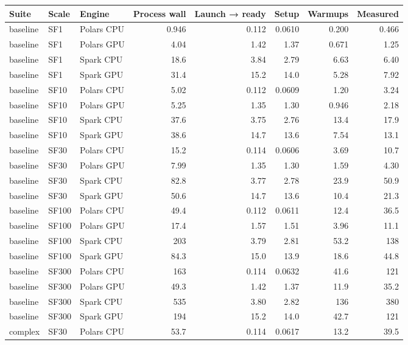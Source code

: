 \begin{longtable}{lllrrrrr}
\toprule
Suite & Scale & Engine & Process wall & Launch → ready & Setup & Warmups & Measured \\
\midrule
\endhead
\bottomrule
\endfoot
baseline & SF1 & Polars CPU & 0.946 & 0.112 & 0.0610 & 0.200 & 0.466 \\
baseline & SF1 & Polars GPU & 4.04 & 1.42 & 1.37 & 0.671 & 1.25 \\
baseline & SF1 & Spark CPU & 18.6 & 3.84 & 2.79 & 6.63 & 6.40 \\
baseline & SF1 & Spark GPU & 31.4 & 15.2 & 14.0 & 5.28 & 7.92 \\
baseline & SF10 & Polars CPU & 5.02 & 0.112 & 0.0609 & 1.20 & 3.24 \\
baseline & SF10 & Polars GPU & 5.25 & 1.35 & 1.30 & 0.946 & 2.18 \\
baseline & SF10 & Spark CPU & 37.6 & 3.75 & 2.76 & 13.4 & 17.9 \\
baseline & SF10 & Spark GPU & 38.6 & 14.7 & 13.6 & 7.54 & 13.1 \\
baseline & SF30 & Polars CPU & 15.2 & 0.114 & 0.0606 & 3.69 & 10.7 \\
baseline & SF30 & Polars GPU & 7.99 & 1.35 & 1.30 & 1.59 & 4.30 \\
baseline & SF30 & Spark CPU & 82.8 & 3.77 & 2.78 & 23.9 & 50.9 \\
baseline & SF30 & Spark GPU & 50.6 & 14.7 & 13.6 & 10.4 & 21.3 \\
baseline & SF100 & Polars CPU & 49.4 & 0.112 & 0.0611 & 12.4 & 36.5 \\
baseline & SF100 & Polars GPU & 17.4 & 1.57 & 1.51 & 3.96 & 11.1 \\
baseline & SF100 & Spark CPU & 203 & 3.79 & 2.81 & 53.2 & 138 \\
baseline & SF100 & Spark GPU & 84.3 & 15.0 & 13.9 & 18.6 & 44.8 \\
baseline & SF300 & Polars CPU & 163 & 0.114 & 0.0632 & 41.6 & 121 \\
baseline & SF300 & Polars GPU & 49.3 & 1.42 & 1.37 & 11.9 & 35.2 \\
baseline & SF300 & Spark CPU & 535 & 3.80 & 2.82 & 136 & 380 \\
baseline & SF300 & Spark GPU & 194 & 15.2 & 14.0 & 42.7 & 121 \\
complex & SF30 & Polars CPU & 53.7 & 0.114 & 0.0617 & 13.2 & 39.5 \\

\end{longtable}
